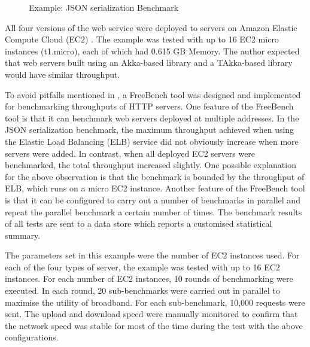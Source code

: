 \lstset{language=html}

\begin{figure}[!h]
\begin{center}
\hfill
  \caption{Example: JSON serialization Benchmark}
\end{center}    
  \label{json_example}
\end{figure}
\lstset{language=scala}


All four versions of the web service were deployed to servers on Amazon 
Elastic Compute Cloud (EC2) \citep{ec2}.  The example was tested with up to 16 
EC2 micro instances (t1.micro), each of which had 0.615 GB Memory.   The author 
expected that web servers built using an Akka-based library and a TAkka-based 
library would have similar throughput.


To avoid pitfalls mentioned in \citep{pitfall}, a FreeBench \citep{freebench} 
tool was designed and implemented for benchmarking throughputs of HTTP 
servers.  One feature of the FreeBench tool is that it can benchmark web 
servers deployed at multiple addresses.  In the JSON serialization benchmark, 
the maximum throughput achieved when using the Elastic Load Balancing (ELB) 
service \citep{elb} did not obviously increase when more servers were added. 
In contrast, when all deployed EC2 servers were benchmarked, the 
total throughput increased slightly. One possible explanation for the above 
observation is that the benchmark is bounded by the throughput of ELB,
which runs on a micro EC2 instance.  Another 
feature of the FreeBench tool is that it can be configured to carry out a 
number of benchmarks in parallel and repeat the parallel benchmark a 
certain number of times.  The benchmark results of all tests are sent to a data 
store which reports a customised statistical summary.

The parameters set in this example were the number of EC2 instances used.  For 
each of the four types of server, the example was tested with up to 16 
EC2 instances.  For each number of EC2 instances, 10 rounds of benchmarking 
were executed. In each round, 20 sub-benchmarks were carried out in parallel to 
maximise the utility of broadband.  For each sub-benchmark, 10,000 requests were
sent.  The upload and download speed were manually monitored to confirm that 
the network speed was stable for most of the time during the test with the 
above configurations.

